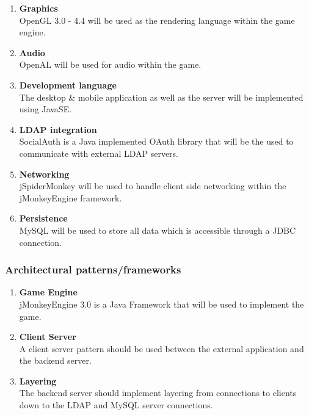 \documentclass[letterpaper]{article}
\begin{document}
				\begin{enumerate}					
					\item \textbf{Graphics}
					\\OpenGL 3.0 - 4.4 will be used as the rendering language within the game engine.
					
					\item \textbf{Audio}
					\\OpenAL will be used for audio within the game.
					
					\item \textbf{Development language}
					\\The desktop \& mobile application as well as the server will be implemented using JavaSE.
					
					\item \textbf{LDAP integration}
					\\SocialAuth is a Java implemented OAuth library that will be the used to communicate with external LDAP servers.
					
					\item \textbf{Networking}
					\\jSpiderMonkey will be used to handle client side networking within the jMonkeyEngine framework.
					
					\item \textbf{Persistence}
					\\MySQL will be used to store all data which is accessible through a JDBC connection.
				\end{enumerate}
				
			\subsubsection*{Architectural patterns/frameworks}
			\vspace{0.1in}
			
				\begin{enumerate}
					\item \textbf{Game Engine}
					\\jMonkeyEngine 3.0 is a Java Framework that will be used to implement the game.
					
					\item \textbf{Client Server}
					\\A client server pattern should be used between the external application and the backend server.
					
					\item \textbf{Layering}
					\\The backend server should implement layering from connections to clients down to the LDAP and MySQL server connections.
				\end{enumerate}
			
\end{document}
